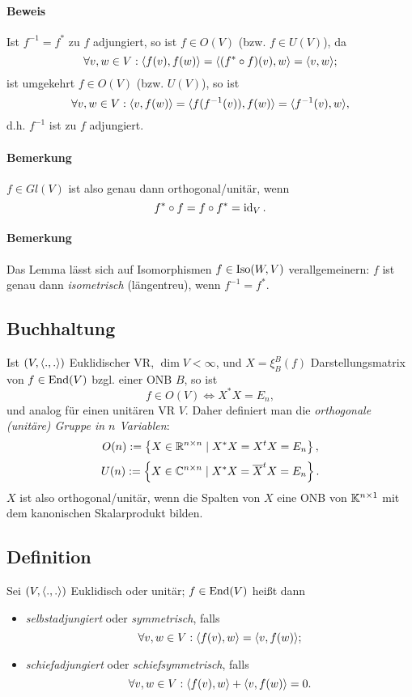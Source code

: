 \paragraph{Beweis}
	Ist $ f^{-1}=f^* $ zu $ f $ adjungiert, so ist $ f\in O(V) $ (bzw. $ f\in U(V) $), da
		\[ \forall v,w\in V: \langle f(v),f(w) \rangle = \langle (f^*\circ f)(v),w \rangle = \langle v,w \rangle; \]
	ist umgekehrt $ f\in O(V) $ (bzw. $ U(V) $), so ist
		\[ \forall v,w\in V: \langle v,f(w) \rangle = \langle f(f^{-1}(v)),f(w) \rangle = \langle f^{-1}(v),w \rangle, \]
	d.h. $ f^{-1} $ ist zu $ f $ adjungiert.
\paragraph{Bemerkung}
	$ f\in Gl(V) $ ist also genau dann orthogonal/unitär, wenn
		\[ f^*\circ f = f\circ f^* = \operatorname{id}_V. \]
\paragraph{Bemerkung}
	Das Lemma lässt sich auf Isomorphismen $ f\in \operatorname{Iso}(W,V) $ verallgemeinern:
	$ f $ ist genau dann \emph{isometrisch} (längentreu), wenn $ f^{-1} = f^* $.

\subsection{Buchhaltung}
	Ist $ (V,\langle .,. \rangle) $ Euklidischer VR, $ \dim V <\infty $,
	und $ X=\xi_B^B(f) $ Darstellungsmatrix von $ f\in \operatorname{End}(V) $ bzgl. einer ONB $ B $,
	so ist
		\[ f\in O(V)\Leftrightarrow X^*X = E_n, \]
	und analog für einen unitären VR $ V $.
	Daher definiert man die \emph{orthogonale (unitäre) Gruppe in $ n $ Variablen}:
		\[ O(n) := \left\{X\in \mathbb{R}^{n\times n}\mid X^*X = X^tX = E_n \right\}, \]
		\[ U(n) := \left\{X\in \mathbb{C}^{n\times n}\mid X^*X = \overline{X}^tX = E_n\right\}.\]
	$ X $ ist also orthogonal/unitär, wenn die Spalten von $ X $ eine ONB von $ \mathbb{K}^{n\times 1} $ mit dem kanonischen Skalarprodukt bilden.

\subsection{Definition}
\begin{Definition}
	Sei $ (V,\langle .,. \rangle) $ Euklidisch oder unitär; $ f\in \operatorname{End}(V) $ heißt dann
		\begin{itemize}
			\item \emph{selbstadjungiert} oder \emph{symmetrisch}, falls
				\[ \forall v,w\in V: \langle f(v),w \rangle = \langle v,f(w) \rangle; \]
			\item \emph{schiefadjungiert} oder \emph{schiefsymmetrisch}, falls
				\[ \forall v,w\in V: \langle f(v),w \rangle + \langle v,f(w) \rangle = 0. \]
		\end{itemize}
\end{Definition}
